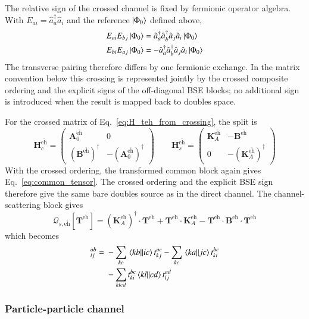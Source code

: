 \documentclass[aip,jcp,reprint,noshowkeys,superscriptaddress]{revtex4-1}
\newcommand{\cre}[1]{\hat{a}_{#1}^{\dagger}}
\newcommand{\ani}[1]{\hat{a}_{#1}}
\newcommand{\teh}{{\overline{\text{eh}}}}
\newcommand{\bT}{\boldsymbol{T}}
\newcommand{\bA}{\boldsymbol{A}}
\newcommand{\bB}{\boldsymbol{B}}
\newcommand{\bH}{\boldsymbol{H}}
\newcommand{\bK}{\boldsymbol{K}}
\newcommand{\bchi}{\boldsymbol{\chi}}
\newcommand{\bcalQ}{\boldsymbol{\mathcal{Q}}}
\begin{document}
The relative sign of the crossed channel is fixed by fermionic operator
algebra. With $E_{ai}=\cre{a}\ani{i}$ and the reference
$\ket{\Phi_0}$ defined above,
\begin{align}
    E_{ai}E_{bj}\ket{\Phi_0}
    &=
    \cre{a}\cre{b}\ani{j}\ani{i}\ket{\Phi_0}
    \\
    E_{bi}E_{aj}\ket{\Phi_0}
    &=
    -\cre{a}\cre{b}\ani{j}\ani{i}\ket{\Phi_0}
    \label{eq:crossed_operator_sign}
\end{align}
The transverse pairing therefore differs by one fermionic exchange.  In the
matrix convention below this crossing is represented jointly by the crossed
composite ordering and the explicit signs of the off-diagonal BSE blocks; no
additional sign is introduced when the result is mapped back to doubles space.

For the crossed matrix of Eq.~\eqref{eq:H_teh_from_crossing}, the split is
\begin{equation}
    \bH_c^{\teh}
    =
    \begin{pmatrix}
        \bA_0^{\teh}&0\\
        (\bB^{\teh})^{\dagger}&-(\bA_0^{\teh})^{\dagger}
    \end{pmatrix}
    \qquad
    \bH_s^{\teh}
    =
    \begin{pmatrix}
        \bK_A^{\teh}&-\bB^{\teh}\\
        0&-(\bK_A^{\teh})^{\dagger}
    \end{pmatrix}
    \label{eq:split_teh}
\end{equation}
With the crossed ordering, the transformed common block again gives
Eq.~\eqref{eq:common_tensor}. The crossed ordering and the explicit BSE sign
therefore give the same bare doubles source as in the direct channel. The
channel-scattering block gives
\begin{equation}
    \bcalQ_{s,\teh}[\bT^{\teh}]
    =
    (\bK_A^{\teh})^{\dagger}\cdot\bT^{\teh}
    +\bT^{\teh}\cdot \bK_A^{\teh}
    -\bT^{\teh}\cdot \bB^{\teh}\cdot\bT^{\teh}
    \label{eq:Xi_teh_matrix}
\end{equation}
which becomes
\begin{align}
    [\bchi^{\teh}]_{ij}^{ab}
    ={}&
    -\sum_{kc}\mel{kb}{}{ic}t_{kj}^{ac}
    -\sum_{kc}\mel{ka}{}{jc}t_{ki}^{bc}
    \nonumber\\
    &-
    \sum_{klcd}
    t_{ki}^{bc}\mel{kl}{}{cd}t_{lj}^{ad}
    \label{eq:Xi_teh_explicit}
\end{align}

\subsubsection{Particle-particle channel}
\end{document}
